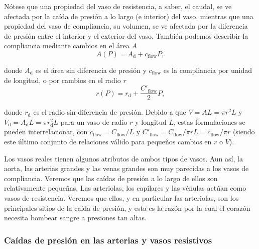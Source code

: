 \documentclass[12pt]{book}
\begin{document}
Nótese que una propiedad del vaso de resistencia, a saber, el caudal, se ve afectada por la caída de presión a lo largo (e interior) del vaso, mientras que una propiedad del vaso de compliancia, su volumen, se ve afectada por la diferencia de presión entre el interior y el exterior del vaso. También podemos describir la compliancia mediante cambios en el área $A$
\begin{equation}
A(P) = A_{\text{d}} + c_{\text{flow}} P,
\label{eq:86}
\end{equation}

donde $A_{\text{d}}$ es el área sin diferencia de presión y $c_{\text{flow}}$ es la compliancia por unidad de longitud, o por cambios en el radio $r$
\begin{equation}
r(P) = r_{\text{d}} + \frac{C'_{\text{flow}}}{2} P,
\label{eq:87}
\end{equation}

donde $r_{\text{d}}$ es el radio sin diferencia de presión. Debido a que $V = A L = \pi r^2 L$ y $V_{\text{d}} = A_{\text{d}} L = \pi r_{\text{d}}^2 L$ para un vaso de radio $r$ y longitud $L$, estas formulaciones se pueden interrelacionar, con $c_{\text{flow}} = C_{\text{flow}}/L$ y $C'_{\text{flow}} = C_{\text{flow}}/\pi r L = c_{\text{flow}}/\pi r$ (siendo este último conjunto de relaciones válido para pequeños cambios en $r$ o $V$).

Los vasos reales tienen algunos atributos de ambos tipos de vasos. Aun así, la aorta, las arterias grandes y las venas grandes son muy parecidas a los vasos de compliancia. Veremos que las caídas de presión a lo largo de ellos son relativamente pequeñas. Las arteriolas, los capilares y las vénulas actúan como vasos de resistencia. Veremos que ellos, y en particular las arteriolas, son los principales sitios de la caída de presión, y esta es la razón por la cual el corazón necesita bombear sangre a presiones tan altas.

\subsubsection*{Caídas de presión en las arterias y vasos resistivos}
\end{document}
